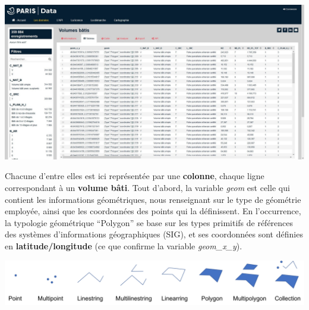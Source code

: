 \documentclass[
  11pt,
  french,
]{article}
\newcounter{customfigs}[section]
\newenvironment{customfigs}[1][] {
    \stepcounter{customfigs}
    Fig \arabic{section}. \arabic{customfigs} : }
\newcommand{\masked}{\vspace*{-\baselineskip}}
\begin{document}
\begin{tcolorbox}[title=\begin{customfigs} Prévisualisation  du jeu de données des volumes bâtis sous forme de tableau. \end{customfigs}]

\begin{center}\includegraphics[width=1\linewidth]{__imgs/site_odp_tableau} \end{center}

\end{tcolorbox}

\hfill\break
Chacune d'entre elles est ici représentée par une \textbf{colonne},
chaque ligne correspondant à un \textbf{volume bâti}. Tout d'abord, la
variable \emph{geom} est celle qui contient les informations
géométriques, nous renseignant sur le type de géométrie employée, ainsi
que les coordonnées des points qui la définissent. En l'occurrence, la
typologie géométrique ``Polygon'' se base sur les types primitifs de
références des systèmes d'informations géographiques (SIG), et ses
coordonnées sont définies en \textbf{latitude/longitude} (ce que
confirme la variable \emph{geom\_x\_y}).\\

\begin{tcolorbox}[title=\begin{customfigs} Primitives géométriques des données géoréférencées \end{customfigs}]

\begin{center}\includegraphics[width=1\linewidth]{__imgs/primitives_geometriques} \end{center}

\end{tcolorbox}
\end{document}

